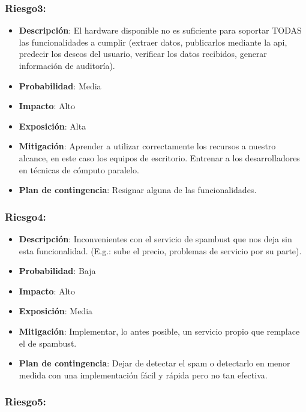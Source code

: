 \subsubsection{Riesgo3:}

\begin{itemize}
\itemsep1pt\parskip0pt
\item
  \textbf{Descripción}: El hardware disponible no es suficiente para
  soportar TODAS las funcionalidades a cumplir (extraer datos,
  publicarlos mediante la api, predecir los deseos del usuario,
  verificar los datos recibidos, generar información de auditoría).
\item
  \textbf{Probabilidad}: Media
\item
  \textbf{Impacto}: Alto
\item
  \textbf{Exposición}: Alta
\item
  \textbf{Mitigación}: Aprender a utilizar correctamente los recursos a
  nuestro alcance, en este caso los equipos de escritorio. Entrenar a
  los desarrolladores en técnicas de cómputo paralelo.
\item
  \textbf{Plan de contingencia}: Resignar alguna de las funcionalidades.
\end{itemize}

\subsubsection{Riesgo4:}

\begin{itemize}
\itemsep1pt\parskip0pt
\item
  \textbf{Descripción}: Inconvenientes con el servicio de spambust que
  nos deja sin esta funcionalidad. (E.g.: sube el precio, problemas de
  servicio por su parte).
\item
  \textbf{Probabilidad}: Baja
\item
  \textbf{Impacto}: Alto
\item
  \textbf{Exposición}: Media
\item
  \textbf{Mitigación}: Implementar, lo antes posible, un servicio propio
  que remplace el de spambust.
\item
  \textbf{Plan de contingencia}: Dejar de detectar el spam o detectarlo
  en menor medida con una implementación fácil y rápida pero no tan
  efectiva.
\end{itemize}

\subsubsection{Riesgo5:}

